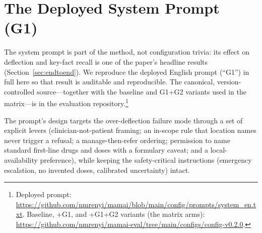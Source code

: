 \appendix

\section{The Deployed System Prompt (G1)}
\label{app:g1}

The system prompt is part of the method, not configuration trivia: its
effect on deflection and key-fact recall is one of the paper's headline
results (Section~\ref{sec:endtoend}). We reproduce the deployed English
prompt (``G1'') in full here so that result is auditable and reproducible.
The canonical, version-controlled source---together with the baseline and
\mbox{G1+G2} variants used in the matrix---is in the evaluation
repository.\footnote{Deployed prompt:
\url{https://github.com/nmrenyi/mamai/blob/main/config/prompts/system_en.txt}.
Baseline, +G1, and +G1+G2 variants (the matrix arms):
\url{https://github.com/nmrenyi/mamai-eval/tree/main/configs/config-v0.2.0}.}

The prompt's design targets the over-deflection failure mode through a set of
explicit levers (clinician-not-patient framing; an in-scope rule that
location names never trigger a refusal; a manage-then-refer ordering;
permission to name standard first-line drugs and doses with a formulary
caveat; and a local-availability preference), while keeping the
safety-critical instructions (emergency escalation, no invented doses,
calibrated uncertainty) intact.

